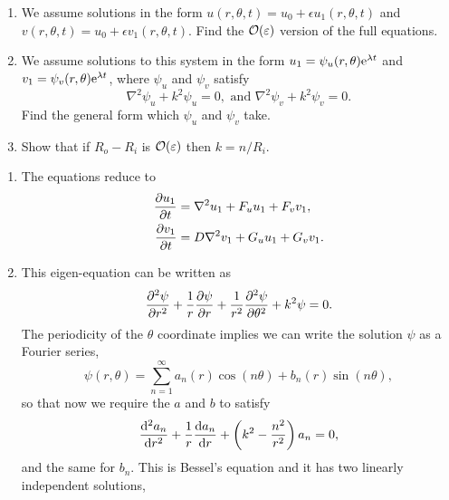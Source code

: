 \documentclass[a4paper, 12pt]{article}
\begin{document}
\begin{enumerate}[label={\bf \arabic{*}.\;}, ref={\arabic{*}},itemsep=3ex, left=0ex]
{      \begin{enumerate}[label=(\alph*)]
        \item{We assume solutions in the form $u(r,\theta,t) = u_0 +\epsilon u_1(r,\theta,t)$ and $v(r,\theta,t) = u_0 +\epsilon v_1(r,\theta,t)$. Find the $\mathcal{O}(\varepsilon) $ version of the full equations.
          }
        \item{We assume solutions to this system in the form $u_1 =\psi_u(r,\theta)\mathrm{e}^{\lambda t}$ and $v_1 =\psi_v(r,\theta)\mathrm{e}^{\lambda t}$, where $\psi_u$ and $\psi_v$ satisfy
            \begin{equation}
              \nabla^2 \psi_u + k^2\psi_u = 0,\mbox{ and } \nabla^2 \psi_v + k^2\psi_v = 0.
            \end{equation}
            Find the general form which $\psi_u$ and $\psi_v$ take.
          }
        \item{Show that if $R_o-R_i$ is $\mathcal{O}(\varepsilon)$ then $k=n/R_i$.
          }
      \end{enumerate}
    }
    {
      \begin{enumerate}[label=(\alph*)]
        \item{
            The equations reduce to
            \begin{align*}
              \pd{u_1}{t} &= \nabla^2 u_1 + F_u u_1 + F_v v_1,\\
              \pd{v_1}{t} &= D\nabla^2 v_1+ G_u u_1 + G_v v_1.
            \end{align*}
          }
        \item{
            This eigen-equation can be written as
            \begin{equation}
              \pdd{\psi}{r} + \frac{1}{r}\pd{\psi}{r} + \frac{1}{r^2}\pdd{\psi}{\theta} + k^2 \psi = 0.
            \end{equation}
            The periodicity of the $\theta$ coordinate implies we can write the solution $\psi$ as a Fourier series,
            \begin{equation}
              \psi(r,\theta) = \sum_{n=1}^{\infty}a_n(r)\cos(n\theta) + b_n(r)\sin(n \theta),
            \end{equation}
            so that now we require the $a$ and $b$ to satisfy
            \begin{equation}
              \fdd{a_n}{r} + \frac{1}{r}\fd{a_n}{r} + \left( k^2-\frac{n^2}{r^2}\right)a_n= 0,
            \end{equation}
            and the same for $b_n$. This is Bessel's equation and it has two linearly independent solutions,
}
\end{enumerate}}
\end{enumerate}
\end{document}
